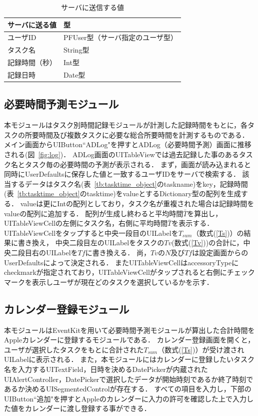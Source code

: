 \begin{table}[htb]
\begin{center}
  \begin{tabular}{|l|l|}\hline
    サーバに送る値 & 型 \\ \hline
    ユーザID & PFUser型（サーバ指定のユーザ型） \\
    タスク名 & String型 \\
    記録時間（秒） & Int型 \\
    記録日時 & Date型 \\
	\hline
  \end{tabular}
  \caption{サーバに送信する値}
  \label{tb:serverdata1}
\end{center}
\end{table}

\subsection{必要時間予測モジュール}  
本モジュールはタスク別時間記録モジュールが計測した記録時間をもとに，各タスクの所要時間及び複数タスクに必要な総合所要時間を計測するものである．
メイン画面からUIButton``ADLog"を押すとADLog（必要時間予測）画面に推移される(図~\ref{fig:log})．
ADLog画面のUITableViewでは過去記録した事のあるタスク名とタスク毎の必要時間の予測が表示される．
まず，画面が読み込まれると同時にUserDefaultsに保存した値と一致するユーザIDをサーバで検索する．
該当するデータはタスク名(表~\ref{tb:tasktime_object}のtaskname)をkey，記録時間(表~\ref{tb:tasktime_object}のtasktime)をvalueとするDictionary型の配列を生成する．
valueは更にIntの配列としており，タスク名が重複された場合は記録時間をvalueの配列に追加する．
配列が生成し終わると平均時間$\bar{T}$を算出し，UITableViewCellの左側にタスク名，右側に平均時間$\bar{T}$を表示する．
UITableViewCellをタップすると中央一段目のUILabelを$T_{sum}$（数式(\ref{Ts})）の結果に書き換え，
中央二段目左のUILabelをタスクの$Tv$(数式(\ref{Tv}))の合計に，中央二段目右のUILabelを$Tf$に書き換える．
尚，$Tv$の$N$及び$Tf$は設定画面からのUserDefaultsによって決定される．
またUITableViewCellはaccessoryTypeにcheckmarkが指定されており，UITableViewCellがタップされると右側にチェックマークを表示しユーザが現在どのタスクを選択しているかを示す．

\subsection{カレンダー登録モジュール}
本モジュールはEventKitを用いて必要時間予測モジュールが算出した合計時間をAppleカレンダーに登録するモジュールである．
カレンダー登録画面を開くと，ユーザが選択したタスクをもとに合計された$T_{sum}$（数式(\ref{Ts})）が受け渡されUILabelに表示される．
また，本モジュールにはカレンダーに登録したいタスク名を入力するUITextField，日時を決めるDatePickerが内蔵されたUIAlertController，DatePickerで選択したデータが開始時刻であるか終了時刻であるか決めるUISegmentedControlが存在する．
すべての項目を入力し，下部のUIButton``追加"を押すとAppleのカレンダーに入力の許可を確認した上で入力した値をカレンダーに渡し登録する事ができる．


